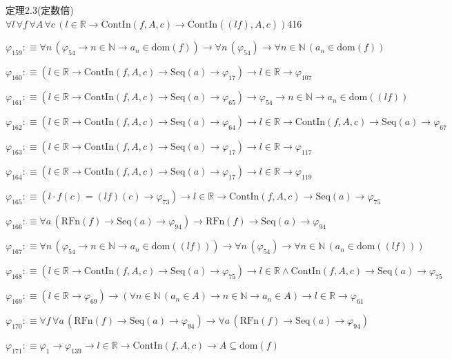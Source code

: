 \begin{fullproof}{定理2.3(定数倍)}{$\forall l\,\forall f\,\forall A\,\forall c\,(l \in \mathbb{R} \to \mathrm{ContIn}(f,A,c) \to \mathrm{ContIn}((l f),A,c))$}{416}
\begin{abbrevlist}
\item $\varphi_{159} :\equiv \forall n\,(\varphi_{54} \to n \in \mathbb{N} \to a_{n} \in \mathrm{dom}(f)) \to \forall n\,(\varphi_{54}) \to \forall n \in \mathbb{N}\,(a_{n} \in \mathrm{dom}(f))$
\item $\varphi_{160} :\equiv (l \in \mathbb{R} \to \mathrm{ContIn}(f,A,c) \to \mathrm{Seq}(a) \to \varphi_{17}) \to l \in \mathbb{R} \to \varphi_{107}$
\item $\varphi_{161} :\equiv (l \in \mathbb{R} \to \mathrm{ContIn}(f,A,c) \to \mathrm{Seq}(a) \to \varphi_{65}) \to \varphi_{54} \to n \in \mathbb{N} \to a_{n} \in \mathrm{dom}((l f))$
\item $\varphi_{162} :\equiv (l \in \mathbb{R} \to \mathrm{ContIn}(f,A,c) \to \mathrm{Seq}(a) \to \varphi_{64}) \to l \in \mathbb{R} \to \mathrm{ContIn}(f,A,c) \to \mathrm{Seq}(a) \to \varphi_{67}$
\item $\varphi_{163} :\equiv (l \in \mathbb{R} \to \mathrm{ContIn}(f,A,c) \to \mathrm{Seq}(a) \to \varphi_{17}) \to l \in \mathbb{R} \to \varphi_{117}$
\item $\varphi_{164} :\equiv (l \in \mathbb{R} \to \mathrm{ContIn}(f,A,c) \to \mathrm{Seq}(a) \to \varphi_{17}) \to l \in \mathbb{R} \to \varphi_{119}$
\item $\varphi_{165} :\equiv (l \cdot f(c) = (l f)(c) \to \varphi_{73}) \to l \in \mathbb{R} \to \mathrm{ContIn}(f,A,c) \to \mathrm{Seq}(a) \to \varphi_{75}$
\item $\varphi_{166} :\equiv \forall a\,(\mathrm{RFn}(f) \to \mathrm{Seq}(a) \to \varphi_{94}) \to \mathrm{RFn}(f) \to \mathrm{Seq}(a) \to \varphi_{94}$
\item $\varphi_{167} :\equiv \forall n\,(\varphi_{54} \to n \in \mathbb{N} \to a_{n} \in \mathrm{dom}((l f))) \to \forall n\,(\varphi_{54}) \to \forall n \in \mathbb{N}\,(a_{n} \in \mathrm{dom}((l f)))$
\item $\varphi_{168} :\equiv (l \in \mathbb{R} \to \mathrm{ContIn}(f,A,c) \to \mathrm{Seq}(a) \to \varphi_{75}) \to l \in \mathbb{R} \land \mathrm{ContIn}(f,A,c) \to \mathrm{Seq}(a) \to \varphi_{75}$
\item $\varphi_{169} :\equiv (l \in \mathbb{R} \to \varphi_{69}) \to (\forall n \in \mathbb{N}\,(a_{n} \in A) \to n \in \mathbb{N} \to a_{n} \in A) \to l \in \mathbb{R} \to \varphi_{61}$
\item $\varphi_{170} :\equiv \forall f\,\forall a\,(\mathrm{RFn}(f) \to \mathrm{Seq}(a) \to \varphi_{94}) \to \forall a\,(\mathrm{RFn}(f) \to \mathrm{Seq}(a) \to \varphi_{94})$
\item $\varphi_{171} :\equiv \varphi_{1} \to \varphi_{139} \to l \in \mathbb{R} \to \mathrm{ContIn}(f,A,c) \to A \subseteq \mathrm{dom}(f)$

\end{abbrevlist}
\end{fullproof}
